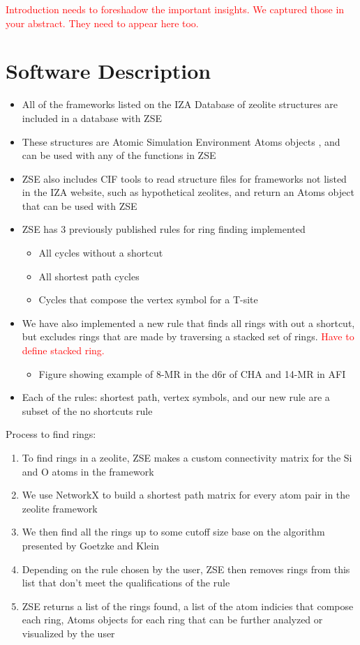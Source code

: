 \documentclass[11pt]{article}
\newcommand{\red}[1]{\textcolor{red}{#1}}
\begin{document}
\red{Introduction needs to foreshadow the important insights. We captured those in your abstract. They need to appear here too.}
\section*{Software Description}
\label{sec:org97556f3}

\begin{itemize}
\item All of the frameworks listed on the IZA Database of zeolite structures \cite{baerlocher-database-nodate} are included in a database with ZSE
\item These structures are Atomic Simulation Environment Atoms objects \cite{larsen-atomic-2017}, and can be used with any of the functions in ZSE
\item ZSE also includes CIF tools to read structure files for frameworks not listed in the IZA website, such as hypothetical zeolites, and return an Atoms object that can be used with ZSE
\item ZSE has 3 previously published rules for ring finding implemented
\begin{itemize}
\item All cycles without a shortcut \cite{goetzke-properties-1991}
\item All shortest path cycles \cite{sastre-topological-2009}
\item Cycles that compose the vertex symbol for a T-site \cite{okeeffe-vertex-1997}
\end{itemize}
\item We have also implemented a new rule that finds all rings with out a shortcut, but excludes rings that are made by traversing a stacked set of rings. \red{Have to define stacked ring.}
\begin{itemize}
\item Figure showing example of 8-MR in the d6r of CHA and 14-MR in AFI
\end{itemize}
\item Each of the rules: shortest path, vertex symbols, and our new rule are a subset of the no shortcuts rule
\end{itemize}
Process to find rings:
\begin{enumerate}
\item To find rings in a zeolite, ZSE makes a custom connectivity matrix for the Si and O atoms in the framework
\item We use NetworkX \cite{hagberg-exploring-2008} to build a shortest path matrix for every atom pair in the zeolite framework
\item We then find all the rings up to some cutoff size base on the algorithm presented by Goetzke and Klein \cite{goetzke-properties-1991}
\item Depending on the rule chosen by the user, ZSE then removes rings from this list that don't meet the qualifications of the rule
\item ZSE returns a list of the rings found, a list of the atom indicies that compose each ring, Atoms objects for each ring that can be further analyzed or visualized by the user
\end{enumerate}
\end{document}
